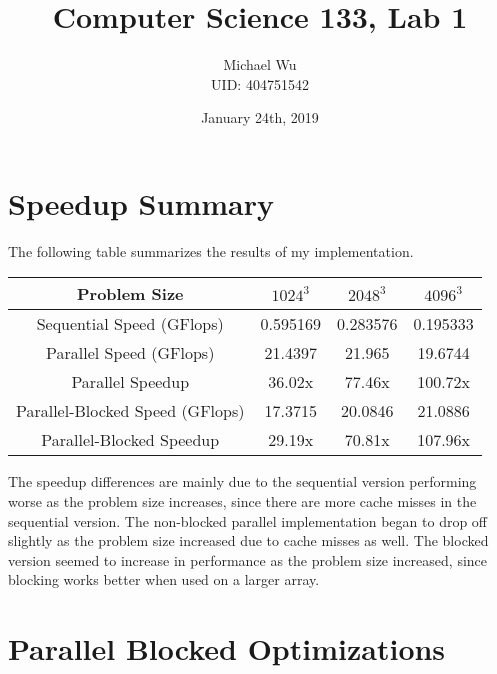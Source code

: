 \documentclass[12pt]{article}
\begin{document}
\title{Computer Science 133, Lab 1}
\date{January 24th, 2019}
\author{Michael Wu\\UID: 404751542}
\maketitle

\section{Speedup Summary}

The following table summarizes the results of my implementation.
\begin{center}
    \begin{tabular}{c|c|c|c}
        Problem Size & \(1024^3\) & \(2048^3\) & \(4096^3\)\\
        \hline
        Sequential Speed (GFlops) & 0.595169 & 0.283576 & 0.195333\\
        Parallel Speed (GFlops) & 21.4397 & 21.965 & 19.6744\\
        Parallel Speedup & 36.02x & 77.46x & 100.72x\\
        Parallel-Blocked Speed (GFlops)& 17.3715 & 20.0846 & 21.0886\\
        Parallel-Blocked Speedup & 29.19x & 70.81x & 107.96x
    \end{tabular}
\end{center}
The speedup differences are mainly due to the sequential version performing
worse as the problem size increases, since there are more cache misses in the
sequential version. The non-blocked parallel implementation began to drop
off slightly as the problem size increased due to cache misses as well. The
blocked version seemed to increase in performance as the problem size increased,
since blocking works better when used on a larger array.

\section{Parallel Blocked Optimizations}
\end{document}
